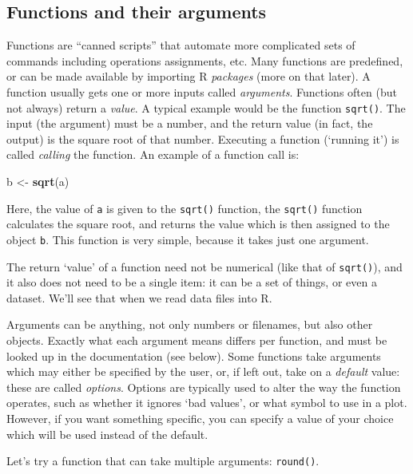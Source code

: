 \documentclass[]{book}
\newenvironment{Shaded}{\begin{snugshade}}{\end{snugshade}}
\newcommand{\KeywordTok}[1]{\textcolor[rgb]{0.13,0.29,0.53}{\textbf{#1}}}
\newcommand{\StringTok}[1]{\textcolor[rgb]{0.31,0.60,0.02}{#1}}
\newcommand{\NormalTok}[1]{#1}
\begin{document}
\subsection{Functions and their
arguments}\label{functions-and-their-arguments}

Functions are ``canned scripts'' that automate more complicated sets of
commands including operations assignments, etc. Many functions are
predefined, or can be made available by importing R \emph{packages}
(more on that later). A function usually gets one or more inputs called
\emph{arguments}. Functions often (but not always) return a
\emph{value}. A typical example would be the function \texttt{sqrt()}.
The input (the argument) must be a number, and the return value (in
fact, the output) is the square root of that number. Executing a
function (`running it') is called \emph{calling} the function. An
example of a function call is:

\begin{Shaded}
\begin{Highlighting}[]
\NormalTok{b <-}\StringTok{ }\KeywordTok{sqrt}\NormalTok{(a)}
\end{Highlighting}
\end{Shaded}

Here, the value of \texttt{a} is given to the \texttt{sqrt()} function,
the \texttt{sqrt()} function calculates the square root, and returns the
value which is then assigned to the object \texttt{b}. This function is
very simple, because it takes just one argument.

The return `value' of a function need not be numerical (like that of
\texttt{sqrt()}), and it also does not need to be a single item: it can
be a set of things, or even a dataset. We'll see that when we read data
files into R.

Arguments can be anything, not only numbers or filenames, but also other
objects. Exactly what each argument means differs per function, and must
be looked up in the documentation (see below). Some functions take
arguments which may either be specified by the user, or, if left out,
take on a \emph{default} value: these are called \emph{options}. Options
are typically used to alter the way the function operates, such as
whether it ignores `bad values', or what symbol to use in a plot.
However, if you want something specific, you can specify a value of your
choice which will be used instead of the default.

Let's try a function that can take multiple arguments: \texttt{round()}.
\end{document}
